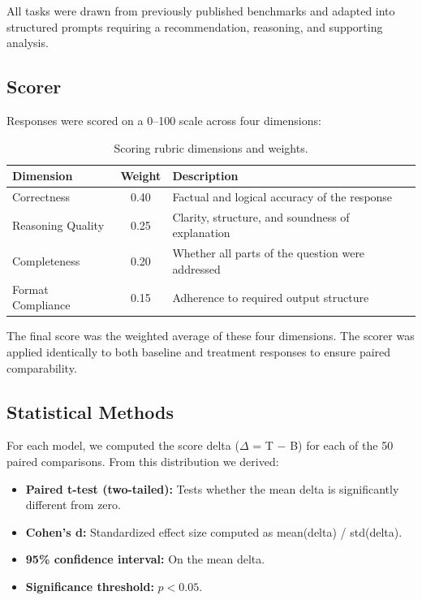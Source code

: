 \documentclass[anonymous, submission, paper]{iclr2026}
\begin{document}
All tasks were drawn from previously published benchmarks and adapted into structured prompts requiring a recommendation, reasoning, and supporting analysis.

\subsection{Scorer}
\label{sec:scorer}

Responses were scored on a 0--100 scale across four dimensions:

\begin{table}[htbp]
  \centering
  \caption{Scoring rubric dimensions and weights.}
  \begin{tabular}{@{}lcl@{}}
    \toprule
    \textbf{Dimension} & \textbf{Weight} & \textbf{Description} \\
    \midrule
    Correctness & 0.40 & Factual and logical accuracy of the response \\
    Reasoning Quality & 0.25 & Clarity, structure, and soundness of explanation \\
    Completeness & 0.20 & Whether all parts of the question were addressed \\
    Format Compliance & 0.15 & Adherence to required output structure \\
    \bottomrule
  \end{tabular}
  \label{tab:scoring_rubric}
\end{table}

The final score was the weighted average of these four dimensions. The scorer was applied identically to both baseline and treatment responses to ensure paired comparability.

\subsection{Statistical Methods}
\label{sec:statistical_methods}

For each model, we computed the score delta ($\Delta$ = T $-$ B) for each of the 50 paired comparisons. From this distribution we derived:

\begin{itemize}
  \item \textbf{Paired t-test (two-tailed):} Tests whether the mean delta is significantly different from zero.
  \item \textbf{Cohen's d:} Standardized effect size computed as mean(delta) / std(delta).
  \item \textbf{95\% confidence interval:} On the mean delta.
  \item \textbf{Significance threshold:} $p < 0.05$.
\end{itemize}
\end{document}
